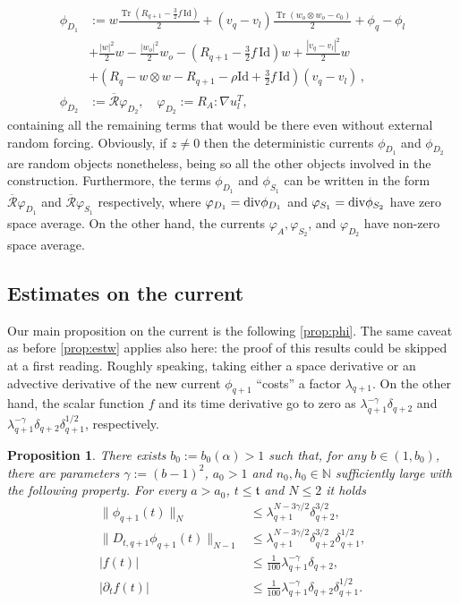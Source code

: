 \documentclass[10pt,a4paper]{amsart}
\numberwithin{equation}{section}
\numberwithin{corollario}{section}
\numberwithin{lemma}{section}
\newtheorem{prop}{Proposition}
\numberwithin{prop}{section}
\theoremstyle{definition}
\theoremstyle{remark}
\newcommand{\N}{\mathbb{N}}
\newcommand{\dvg}{\mathord{{\rm div}}}
\newcommand{\Id}{\mathrm{Id}}
\DeclareMathOperator{\Tr}{Tr}
\newcommand{\qq}{_{q+1}}
\newcommand{\qqq}{_{q+2}}
\begin{document}
    \begin{align}
    \label{e:phiD1} 
        \phi_{D_1}&:=w\frac{\Tr(R\qq-\frac{3}{2}f\,\Id)}{2}+(v_q-v_l)\frac{\Tr(w_o \otimes w_o-c_0)}{2}+\phi_q-\phi_l\\
        &+\frac{|w|^2}{2}w-\frac{|w_o|^2}{2}w_o-\left(R\qq-\frac{3}{2}f\,\Id\right)w+\frac{|v_q-v_l|^2}{2}w\\
        &+\left(R_q-w \otimes w-R\qq-\rho\Id+\frac32f\,\Id\right)(v_q-v_l)\,,
    \\
\label{e:phiD2}
\phi_{D_2}
&:=
\overline{\mathcal{R}} \varphi_{D_2},
\quad
\varphi_{D_2}
:=
R_A:\nabla u_l^T ,
    \end{align}
containing all the remaining terms that would be there even without external random forcing.
Obviously, if $z \neq 0$ then the deterministic currents $\phi_{D_1}$ and $\phi_{D_2}$ are random objects nonetheless, being so all the other objects involved in the construction.
Furthermore, the terms $\phi_{D_1}$ and $\phi_{S_1}$ can be written in the form $\overline{\mathcal{R}} \varphi_{D_1}$ and $\overline{\mathcal{R}} \varphi_{S_1}$ respectively, where $\varphi_{D_1} = \dvg \phi_{D_1}$ and $ \varphi_{S_1} = \dvg \phi_{S_2}$ have zero space average. On the other hand, the currents $\varphi_A, \varphi_{S_2}$, and $\varphi_{D_2}$ have non-zero space average. 

\subsection{Estimates on the current}
\label{ssec:estimatesPhi}
Our main proposition on the current is the following \autoref{prop:phi}. The same caveat as before \autoref{prop:estw} applies also here: the proof of this results could be skipped at a first reading. 
Roughly speaking, taking either a space derivative or an advective derivative of the new current $\phi\qq$ ``costs'' a factor $\lambda\qq$. On the other hand, the scalar function $f$ and its time derivative go to zero as $\lambda\qq^{-\gamma}\delta\qqq$ and $\lambda\qq^{-\gamma}\delta\qqq\delta\qq^{1/2}$, respectively.


\begin{prop} \label{prop:phi}
   There exists $ b_0:=b_0(\alpha)>1$ such that, for any $b\in (1,b_0)$, there are parameters $\gamma:=(b-1)^2$,  $a_0>1$ and $n_0,h_0\in \N$ sufficiently large with the following property.
   For every $a>a_0$, $t\le \mathfrak{t}$ and $N\le 2$ it holds 
    \begin{align} 
        \|\phi\qq(t)\|_N&\label{est:phi}\le \lambda\qq ^{N-3\gamma/2}\delta_{q+2}^{3/2},
        \\
        \|D_{t,q+1}\phi\qq(t)\|_{N-1}&\label{est:Dphi}\le \lambda\qq ^{N-3\gamma/2}\delta_{q+2}^{3/2}\delta\qq^{1/2},
        \\
        |f(t)|&\le\frac{1}{100} \lambda\qq^{-\gamma}\delta\qqq,
        \\
        |\partial_t f(t)|&\le \frac{1}{100}\lambda\qq^{-\gamma}\delta\qqq\delta\qq^{1/2}.
    \end{align}
\end{prop}
\end{document}
